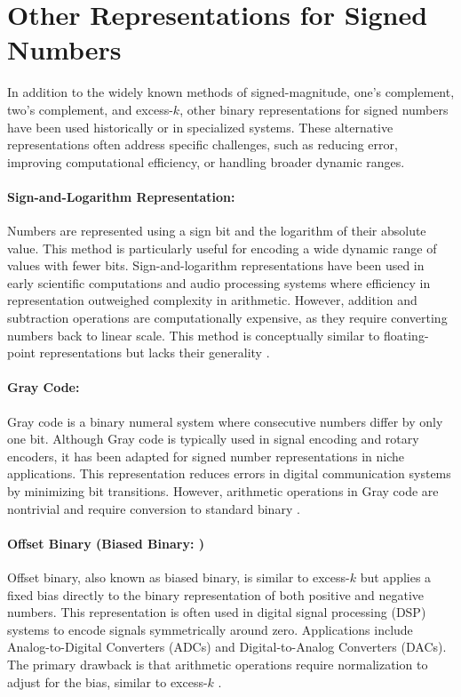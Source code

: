 \section{Other Representations for Signed Numbers}
In addition to the widely known methods of signed-magnitude, one's complement, two's complement, and excess-\( k \), other binary representations for signed numbers have been used historically or in specialized systems. These alternative representations often address specific challenges, such as reducing error, improving computational efficiency, or handling broader dynamic ranges.


\paragraph{Sign-and-Logarithm Representation: } 
Numbers are represented using a sign bit and the logarithm of their absolute value. This method is particularly useful for encoding a wide dynamic range of values with fewer bits. Sign-and-logarithm representations have been used in early scientific computations and audio processing systems where efficiency in representation outweighed complexity in arithmetic. However, addition and subtraction operations are computationally expensive, as they require converting numbers back to linear scale. This method is conceptually similar to floating-point representations but lacks their generality \cite{hamming1980}.

\paragraph{Gray Code: } 
Gray code is a binary numeral system where consecutive numbers differ by only one bit. Although Gray code is typically used in signal encoding and rotary encoders, it has been adapted for signed number representations in niche applications. This representation reduces errors in digital communication systems by minimizing bit transitions. However, arithmetic operations in Gray code are nontrivial and require conversion to standard binary \cite{gray1953}.

\paragraph{Offset Binary (Biased Binary: )} 
Offset binary, also known as biased binary, is similar to excess-\( k \) but applies a fixed bias directly to the binary representation of both positive and negative numbers. This representation is often used in digital signal processing (DSP) systems to encode signals symmetrically around zero. Applications include Analog-to-Digital Converters (ADCs) and Digital-to-Analog Converters (DACs). The primary drawback is that arithmetic operations require normalization to adjust for the bias, similar to excess-\( k \) \cite{oppenheim2014}.

